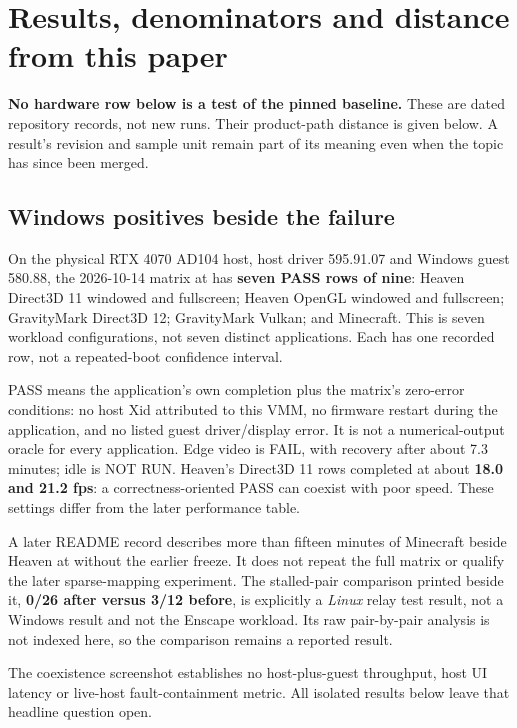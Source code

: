 \section{Results, denominators and distance from this paper}
\label{sec:results}

\textbf{No hardware row below is a test of the pinned baseline.} These are dated repository
records, not new runs. Their product-path distance is given below. A result's revision and
sample unit remain part of its meaning even when the topic has since been merged.

\subsection{Windows positives beside the failure}

\reported On the physical RTX 4070 AD104 host, host driver 595.91.07 and Windows guest 580.88,
the 2026-10-14 matrix at  has \textbf{seven PASS rows of nine}: Heaven Direct3D 11
windowed and fullscreen; Heaven OpenGL windowed and fullscreen; GravityMark Direct3D 12;
GravityMark Vulkan; and Minecraft. This is seven workload configurations, not seven distinct
applications. Each has one recorded row, not a repeated-boot confidence interval.

PASS means the application's own completion plus the matrix's zero-error conditions: no
host Xid attributed to this VMM, no firmware restart during the application, and no listed
guest driver/display error. It is not a numerical-output oracle for every application.
Edge video is FAIL, with recovery after about 7.3 minutes; idle is NOT RUN.
Heaven's Direct3D 11 rows completed at about \textbf{18.0 and 21.2 fps}: a correctness-oriented
PASS can coexist with poor speed. These settings differ from the later performance table.

\reported A later README record describes more than fifteen minutes of Minecraft beside
Heaven at  without the earlier freeze. It does not repeat the full matrix or
qualify the later sparse-mapping experiment. The stalled-pair comparison printed beside it,
\textbf{0/26 after versus 3/12 before}, is explicitly a \emph{Linux} relay test result, not a
Windows result and not the Enscape workload. Its raw pair-by-pair analysis is not indexed here,
so the comparison remains a reported result.

\unmeasured The coexistence screenshot establishes no host-plus-guest throughput, host UI
latency or live-host fault-containment metric. All isolated results below leave that headline
question open.

